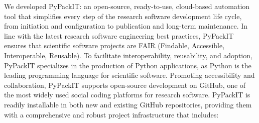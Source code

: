 \documentclass{article}
\begin{document}
We developed PyPackIT: an open-source, ready-to-use, cloud-based automation tool that simplifies every step of the research software development life cycle, from initiation and configuration to publication and long-term maintenance. In line with the latest research software engineering best practices, PyPackIT ensures that scientific software projects are FAIR (Findable, Accessible, Interoperable, Reusable). To facilitate interoperability, reusability, and adoption, PyPackIT specializes in the production of Python applications, as Python is the leading programming language for scientific software. Promoting accessibility and collaboration, PyPackIT supports open-source development on GitHub, one of the most widely used social coding platforms for research software. PyPackIT is readily installable in both new and existing GitHub repositories, providing them with a comprehensive and robust project infrastructure that includes:
\end{document}
